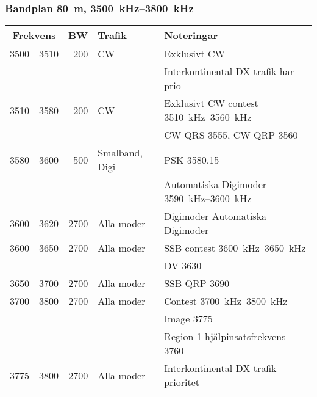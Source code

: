 \subsubsection{Bandplan \qty{80}{\metre}, \SIrange{3500}{3800}{\kilo\hertz}}
\begin{tabular}{rrrll}
\multicolumn{2}{c}{\textbf{Frekvens}} & \textbf{BW} & \textbf{Trafik}
& \textbf{Noteringar} \\ \hline

3500 & 3510 & 200  & CW             & Exklusivt CW                                    \\ 
     &      &      &                & Interkontinental DX-trafik har prio             \\ \hline
3510 & 3580 & 200  & CW             & Exklusivt CW contest \SIrange{3510}{3560}{\kilo\hertz}  \\ 
     &      &      &                & CW QRS \num{3555}, CW QRP \num{3560}            \\ \hline
3580 & 3600 & 500  & Smalband, Digi & PSK \num{3580,15}                               \\
     &      &      &                & Automatiska Digimoder \SIrange{3590}{3600}{\kilo\hertz} \\ \hline
3600 & 3620 & 2700 & Alla moder     & Digimoder Automatiska Digimoder                 \\ \hline
3600 & 3650 & 2700 & Alla moder     & SSB contest \SIrange{3600}{3650}{\kilo\hertz}           \\
     &      &      &                & DV \num{3630}                                   \\ \hline
3650 & 3700 & 2700 & Alla moder     & SSB QRP \num{3690}                              \\ \hline
3700 & 3800 & 2700 & Alla moder     & Contest \SIrange{3700}{3800}{\kilo\hertz}               \\
     &      &      &                & Image \num{3775}                                \\
     &      &      &                & Region 1 hjälpinsatsfrekvens \num{3760}         \\ \hline
3775 & 3800 & 2700 & Alla moder     & Interkontinental DX-trafik prioritet            \\ \hline
\end{tabular}

